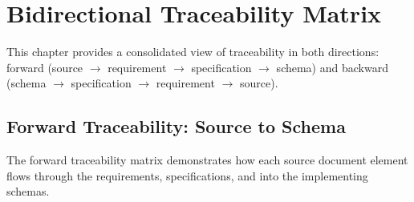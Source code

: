 \chapter{Bidirectional Traceability Matrix}
\label{ch:bidirectional-traceability}

This chapter provides a consolidated view of traceability in both directions:
forward (source $\rightarrow$ requirement $\rightarrow$ specification $\rightarrow$ schema)
and backward (schema $\rightarrow$ specification $\rightarrow$ requirement $\rightarrow$ source).

\section{Forward Traceability: Source to Schema}
\label{sec:forward-traceability}

The forward traceability matrix demonstrates how each source document
element flows through the requirements, specifications, and into the
implementing schemas.

